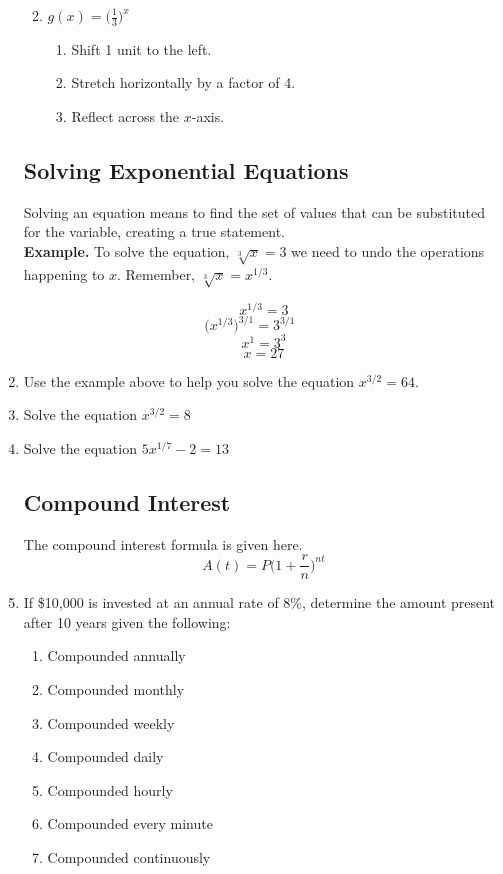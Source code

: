 \begin{enumerate}
\begin{enumerate}
\vfill


\item $\displaystyle g(x)=\Big(\frac{1}{3}\Big)^x$
\begin{enumerate}
\item Shift 1 unit to the left.
\item Stretch horizontally by a factor of 4.
\item Reflect across the $x$-axis.
\end{enumerate}

\vfill


\end{enumerate}

\newpage
\newpage
\subsection{Solving Exponential Equations}
Solving an equation means to find the set of values that can be substituted for the variable, creating a true statement.\\


\textbf{Example.} To solve the equation, $\sqrt[3]{x}=3$ we need to undo the operations happening to $x$.  Remember, $\sqrt[3]{x}=x^{1/3}$.


$$x^{1/3}=3$$
$$\Big(x^{1/3}\Big)^{3/1}=3^{3/1}\quad \quad $$
$$x^1=3^3$$
$$x=27$$
\item Use the example above to help you solve the equation $x^{3/2}=64$.\vfill

\item Solve the equation $x^{3/2}=8$\vfill


\item Solve the equation $5x^{1/7}-2=13$
\vfill




\newpage
\subsection{Compound Interest}


\noindent The compound interest formula is given here.
$$A(t)=P\Bigg(1+\frac{r}{n}\Bigg) ^{nt}$$


\item If \$10,000 is invested at an annual rate of 8\%, determine the amount present after 10 years given the following:

\begin{enumerate}
\item Compounded annually\vfill
\item Compounded monthly \vfill
\item Compounded weekly \vfill
\item Compounded daily \vfill
\item Compounded hourly \vfill
\item Compounded every minute \vfill
\item Compounded continuously\vfill
\end{enumerate}




\end{enumerate}
